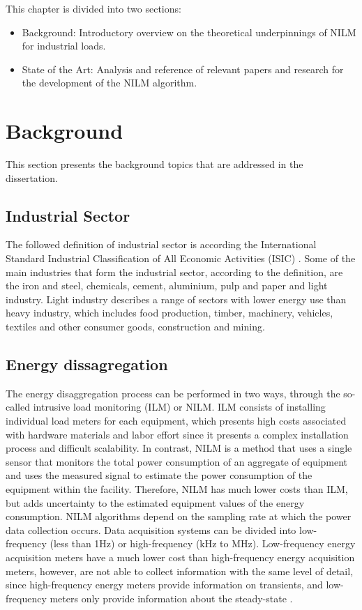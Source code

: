 
This chapter is divided into two sections:
\begin{itemize}
    \item Background: Introductory overview on the theoretical underpinnings of NILM for industrial loads.
    \item State of the Art: Analysis and reference of relevant papers and research for the development of the NILM algorithm.
\end{itemize}


\section{Background}
This section presents the background topics that are addressed in the dissertation.


\subsection{Industrial Sector}
The followed definition of industrial sector is according the International Standard Industrial Classification of All Economic Activities (ISIC) \cite{ISIC}. Some of the main industries that form the industrial sector, according to the definition, are the iron and steel, chemicals, cement, aluminium, pulp and paper and light industry. Light industry describes a range of sectors with lower energy use than heavy industry, which includes food production, timber, machinery, vehicles, textiles and other consumer goods, construction and mining.

\subsection{Energy dissagregation}
The energy disaggregation process can be performed in two ways, through the so-called intrusive load monitoring (ILM) or NILM. ILM consists of installing individual load meters for each equipment, which presents high costs associated with hardware materials and labor effort since it presents a complex installation process and difficult scalability. In contrast, NILM is a method that uses a single sensor that monitors the total power consumption of an aggregate of equipment and uses the measured signal to estimate the power consumption of the equipment within the facility. Therefore, NILM has much lower costs than ILM, but adds uncertainty to the estimated equipment values of the energy consumption.
NILM algorithms depend on the sampling rate at which the power data collection occurs. Data acquisition systems can be divided into low-frequency (less than 1Hz) or high-frequency (kHz to MHz).
Low-frequency energy acquisition meters have a much lower cost than high-frequency energy acquisition meters, however, are not able to collect information with the same level of detail, since high-frequency energy meters provide information on transients, and low-frequency meters only provide information about the steady-state \cite{Application_NILM_Techniques_EnergyManagement_AssistedLiving, Overview_NILM, Overview_NILM_Aproaches, NILM_Techniques}.

